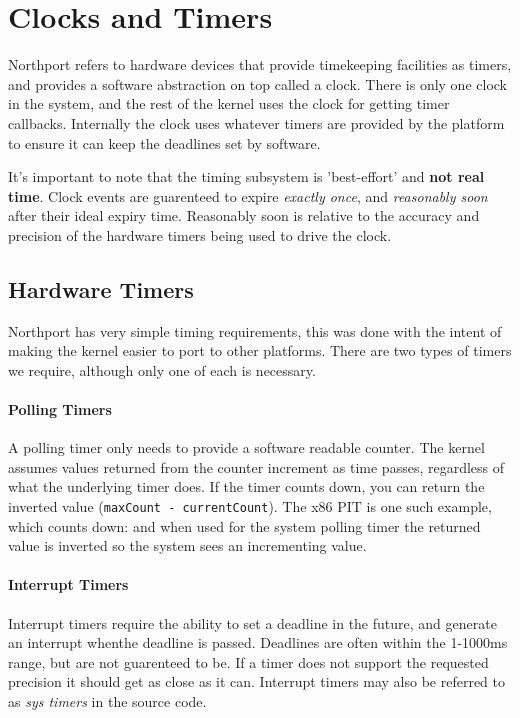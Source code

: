 \section{Clocks and Timers}
Northport refers to hardware devices that provide timekeeping facilities as timers, and provides a software abstraction on top called a clock. There is only one clock in the system, and the rest of the kernel uses the clock for getting timer callbacks. Internally the clock uses whatever timers are provided by the platform to ensure it can keep the deadlines set by software.

It's important to note that the timing subsystem is 'best-effort' and \textbf{not real time}. Clock events are guarenteed to expire \textit{exactly once}, and \textit{reasonably soon} after their ideal expiry time. Reasonably soon is relative to the accuracy and precision of the hardware timers being used to drive the clock.

\subsection{Hardware Timers}
Northport has very simple timing requirements, this was done with the intent of making the kernel easier to port to other platforms. There are two types of timers we require, although only one of each is necessary.

\paragraph{Polling Timers}
A polling timer only needs to provide a software readable counter. The kernel assumes values returned from the counter increment as time passes, regardless of what the underlying timer does. If the timer counts down, you can return the inverted value (\verb|maxCount - currentCount|). The x86 PIT is one such example, which counts down: and when used for the system polling timer the returned value is inverted so the system sees an incrementing value.

\paragraph{Interrupt Timers}
Interrupt timers require the ability to set a deadline in the future, and generate an interrupt whenthe deadline is passed. Deadlines are often within the 1-1000ms range, but are not guarenteed to be. If a timer does not support the requested precision it should get as close as it can. Interrupt timers may also be referred to as \textit{sys timers} in the source code.

